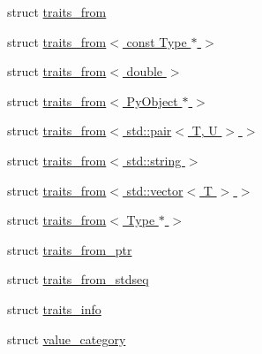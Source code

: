 \begin{DoxyCompactItemize}
struct \hyperlink{structswig_1_1traits__from}{traits\+\_\+from}
\item 
struct \hyperlink{structswig_1_1traits__from_3_01const_01_type_01_5_01_4}{traits\+\_\+from$<$ const Type $\ast$ $>$}
\item 
struct \hyperlink{structswig_1_1traits__from_3_01double_01_4}{traits\+\_\+from$<$ double $>$}
\item 
struct \hyperlink{structswig_1_1traits__from_3_01_py_object_01_5_01_4}{traits\+\_\+from$<$ Py\+Object $\ast$ $>$}
\item 
struct \hyperlink{structswig_1_1traits__from_3_01std_1_1pair_3_01_t_00_01_u_01_4_01_4}{traits\+\_\+from$<$ std\+::pair$<$ T, U $>$ $>$}
\item 
struct \hyperlink{structswig_1_1traits__from_3_01std_1_1string_01_4}{traits\+\_\+from$<$ std\+::string $>$}
\item 
struct \hyperlink{structswig_1_1traits__from_3_01std_1_1vector_3_01_t_01_4_01_4}{traits\+\_\+from$<$ std\+::vector$<$ T $>$ $>$}
\item 
struct \hyperlink{structswig_1_1traits__from_3_01_type_01_5_01_4}{traits\+\_\+from$<$ Type $\ast$ $>$}
\item 
struct \hyperlink{structswig_1_1traits__from__ptr}{traits\+\_\+from\+\_\+ptr}
\item 
struct \hyperlink{structswig_1_1traits__from__stdseq}{traits\+\_\+from\+\_\+stdseq}
\item 
struct \hyperlink{structswig_1_1traits__info}{traits\+\_\+info}
\item 
struct \hyperlink{structswig_1_1value__category}{value\+\_\+category}
\end{DoxyCompactItemize}

